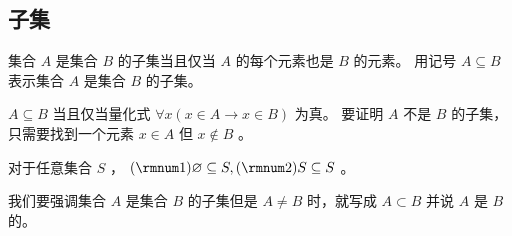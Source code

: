 {    \subsection{子集}
    {
        \begin{defines}
            集合 $A$ 是集合 $B$ 的子集当且仅当 $A$ 的每个元素也是 $B$ 的元素。
            用记号 $A \subseteq B$ 表示集合 $A$ 是集合 $B$ 的子集。

            $A \subseteq B$ 当且仅当量化式 $\forall x (x \in A \rightarrow x \in B)$ 为真。
            要证明 $A$ 不是 $B$ 的子集，只需要找到一个元素 $x \in A$ 但 $x \notin B$ 。
        \end{defines}

        \begin{defines}
            对于任意集合 $S$ ， $(\rmnum 1) \varnothing \subseteq S, (\rmnum 2) S \subseteq S$ 。
        \end{defines}

        我们要强调集合 $A$ 是集合 $B$ 的子集但是 $A \neq B$ 时，就写成 $A \subset B$ 并说 $A$ 是 $B$ 的。
    }
}

